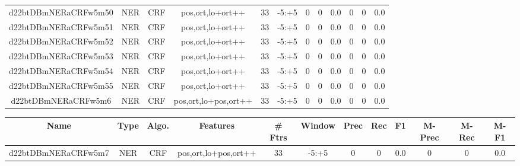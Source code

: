 \documentclass[a4paper]{article}
\begin{document}
\begin{landscape}
\begin{center}
\begin{tabular}{ |c|c|c|c|c|c|c|c|c|c|c|c|}
 
 	
 	\small{ d22btDBmNERaCRFw5m50 } & \small{ NER} & \small{  CRF }  & pos,ort,lo+ort++  &  33 &  \small{  -5:+5 }  &  0 & 0 & 0.0  &  0 & 0 & 0.0 \\
 	

 
 	
 	\small{ d22btDBmNERaCRFw5m51 } & \small{ NER} & \small{  CRF }  & pos,ort,lo+ort++  &  33 &  \small{  -5:+5 }  &  0 & 0 & 0.0  &  0 & 0 & 0.0 \\
 	

 
 	
 	\small{ d22btDBmNERaCRFw5m52 } & \small{ NER} & \small{  CRF }  & pos,ort,lo+ort++  &  33 &  \small{  -5:+5 }  &  0 & 0 & 0.0  &  0 & 0 & 0.0 \\
 	

 
 	
 	\small{ d22btDBmNERaCRFw5m53 } & \small{ NER} & \small{  CRF }  & pos,ort,lo+ort++  &  33 &  \small{  -5:+5 }  &  0 & 0 & 0.0  &  0 & 0 & 0.0 \\
 	

 
 	
 	\small{ d22btDBmNERaCRFw5m54 } & \small{ NER} & \small{  CRF }  & pos,ort,lo+ort++  &  33 &  \small{  -5:+5 }  &  0 & 0 & 0.0  &  0 & 0 & 0.0 \\
 	

 
 	
 	\small{ d22btDBmNERaCRFw5m55 } & \small{ NER} & \small{  CRF }  & pos,ort,lo+ort++  &  33 &  \small{  -5:+5 }  &  0 & 0 & 0.0  &  0 & 0 & 0.0 \\
 	

 
 	
 	\small{ d22btDBmNERaCRFw5m6 } & \small{ NER} & \small{  CRF }  & pos,ort,lo+pos,ort++  &  33 &  \small{  -5:+5 }  &  0 & 0 & 0.0  &  0 & 0 & 0.0 \\
 	
 \hline
\end{tabular}
\end{center}




\begin{center}
\begin{tabular}{ |c|c|c|c|c|c|c|c|c|c|c|c|} 
 \hline
 	Name & Type & Algo. & Features & \# Ftrs & Window & Prec & Rec & F1 & M-Prec & M-Rec & M-F1\\
 \hline

 	

 
 	
 	\small{ d22btDBmNERaCRFw5m7 } & \small{ NER} & \small{  CRF }  & pos,ort,lo+pos,ort++  &  33 &  \small{  -5:+5 }  &  0 & 0 & 0.0  &  0 & 0 & 0.0 \\
 	


\end{tabular}
\end{center}
\end{landscape}
\end{document}

